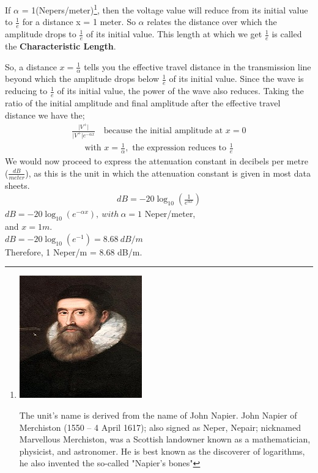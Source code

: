 If $\alpha$ = 1(Nepers/meter)\footnote{
\includegraphics[scale=0.2]{./graphics/johnnapier2}

The unit's name is derived from the name of John Napier. John Napier of Merchiston (1550 – 4 April 1617); also signed as Neper, Nepair; nicknamed Marvellous Merchiston, was a Scottish landowner known as a mathematician, physicist, and astronomer. He is best known as the discoverer of logarithms, he also invented the so-called "Napier's bones"}, then the voltage value will reduce from its initial value to $\frac{1}{e}$ for a distance x = 1 meter. So $\alpha$ relates the distance over which the amplitude drops to $\frac{1}{e}$ of its initial value. This length at which we get $\frac{1}{e}$ is called the \textbf{Characteristic Length}. 

So, a distance $x = \frac{1}{\alpha}$ tells you the effective travel distance in the transmission line beyond which the amplitude drops below $\frac{1}{e}$ of its initial value. Since the wave is reducing to $\frac{1}{e}$ of its initial value, the power of the wave also reduces. Taking the ratio of the initial amplitude and final amplitude after the effective travel distance we have the;
\begin{align*}
 \frac{\lvert V^+\rvert}{\lvert V^+\rvert e ^{-\alpha x}} \quad \text{because the initial amplitude at } x = 0
\end{align*}
\begin{align*}
\text{with }x = \frac{1}{\alpha},\text{ the expression reduces to }\frac{1}{e}
\end{align*}
We would now proceed to express the attenuation constant in decibels per metre ($\frac{dB}{meter}$), as this is the unit in which the attenuation constant is given in most data sheets.
\begin{align*}
dB = -20\log_{10}(\frac{1}{e^{\alpha x}})
\end{align*}
$ dB = -20\log_{10}(e^{-\alpha x}), \ with \ \alpha = 1 $ Neper/meter,\\ and $ x = 1m $. \\
$ dB = -20\log_{10}(e^{-1}) = 8.68\ dB/m  $\\
Therefore, 1 Neper/m = 8.68 dB/m.\\

